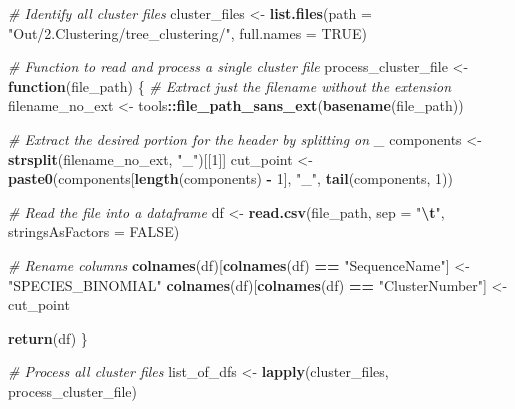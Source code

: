 \documentclass[
]{article}
\newenvironment{Shaded}{\begin{snugshade}}{\end{snugshade}}
\newcommand{\AttributeTok}[1]{\textcolor[rgb]{0.13,0.29,0.53}{#1}}
\newcommand{\CommentTok}[1]{\textcolor[rgb]{0.56,0.35,0.01}{\textit{#1}}}
\newcommand{\ConstantTok}[1]{\textcolor[rgb]{0.56,0.35,0.01}{#1}}
\newcommand{\ControlFlowTok}[1]{\textcolor[rgb]{0.13,0.29,0.53}{\textbf{#1}}}
\newcommand{\DecValTok}[1]{\textcolor[rgb]{0.00,0.00,0.81}{#1}}
\newcommand{\FunctionTok}[1]{\textcolor[rgb]{0.13,0.29,0.53}{\textbf{#1}}}
\newcommand{\NormalTok}[1]{#1}
\newcommand{\OtherTok}[1]{\textcolor[rgb]{0.56,0.35,0.01}{#1}}
\newcommand{\SpecialCharTok}[1]{\textcolor[rgb]{0.81,0.36,0.00}{\textbf{#1}}}
\newcommand{\StringTok}[1]{\textcolor[rgb]{0.31,0.60,0.02}{#1}}
\begin{document}
\begin{Shaded}
\begin{Highlighting}[]
\CommentTok{\# Identify all cluster files}
\NormalTok{cluster\_files }\OtherTok{\textless{}{-}} \FunctionTok{list.files}\NormalTok{(}\AttributeTok{path =} \StringTok{"Out/2.Clustering/tree\_clustering/"}\NormalTok{, }\AttributeTok{full.names =} \ConstantTok{TRUE}\NormalTok{)}

\CommentTok{\# Function to read and process a single cluster file}
\NormalTok{process\_cluster\_file }\OtherTok{\textless{}{-}} \ControlFlowTok{function}\NormalTok{(file\_path) \{}
  \CommentTok{\# Extract just the filename without the extension}
\NormalTok{  filename\_no\_ext }\OtherTok{\textless{}{-}}\NormalTok{ tools}\SpecialCharTok{::}\FunctionTok{file\_path\_sans\_ext}\NormalTok{(}\FunctionTok{basename}\NormalTok{(file\_path))}
  
  \CommentTok{\# Extract the desired portion for the header by splitting on \textquotesingle{}\_\textquotesingle{}}
\NormalTok{  components }\OtherTok{\textless{}{-}} \FunctionTok{strsplit}\NormalTok{(filename\_no\_ext, }\StringTok{"\_"}\NormalTok{)[[}\DecValTok{1}\NormalTok{]]}
\NormalTok{  cut\_point }\OtherTok{\textless{}{-}} \FunctionTok{paste0}\NormalTok{(components[}\FunctionTok{length}\NormalTok{(components) }\SpecialCharTok{{-}} \DecValTok{1}\NormalTok{], }\StringTok{"\_"}\NormalTok{, }\FunctionTok{tail}\NormalTok{(components, }\DecValTok{1}\NormalTok{))}
  
  \CommentTok{\# Read the file into a dataframe}
\NormalTok{  df }\OtherTok{\textless{}{-}} \FunctionTok{read.csv}\NormalTok{(file\_path, }\AttributeTok{sep =} \StringTok{"}\SpecialCharTok{\textbackslash{}t}\StringTok{"}\NormalTok{, }\AttributeTok{stringsAsFactors =} \ConstantTok{FALSE}\NormalTok{)}
  
  \CommentTok{\# Rename columns}
  \FunctionTok{colnames}\NormalTok{(df)[}\FunctionTok{colnames}\NormalTok{(df) }\SpecialCharTok{==} \StringTok{"SequenceName"}\NormalTok{] }\OtherTok{\textless{}{-}} \StringTok{"SPECIES\_BINOMIAL"}
  \FunctionTok{colnames}\NormalTok{(df)[}\FunctionTok{colnames}\NormalTok{(df) }\SpecialCharTok{==} \StringTok{"ClusterNumber"}\NormalTok{] }\OtherTok{\textless{}{-}}\NormalTok{ cut\_point}
  
  \FunctionTok{return}\NormalTok{(df)}
\NormalTok{\}}

\CommentTok{\# Process all cluster files}
\NormalTok{list\_of\_dfs }\OtherTok{\textless{}{-}} \FunctionTok{lapply}\NormalTok{(cluster\_files, process\_cluster\_file)}


\end{Highlighting}
\end{Shaded}
\end{document}

